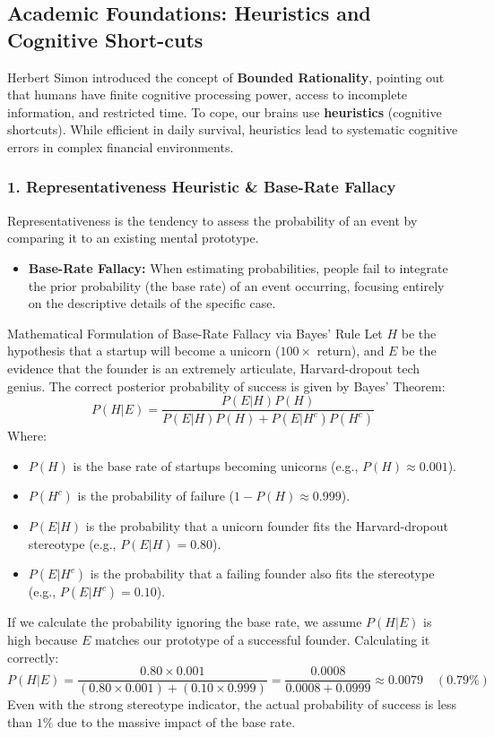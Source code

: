 \documentclass[11pt,a4paper]{article}
\begin{document}
\subsection{Academic Foundations: Heuristics and Cognitive Short-cuts}
Herbert Simon introduced the concept of \textbf{Bounded Rationality}, pointing out that humans have finite cognitive processing power, access to incomplete information, and restricted time. To cope, our brains use \textbf{heuristics} (cognitive shortcuts). While efficient in daily survival, heuristics lead to systematic cognitive errors in complex financial environments.

\subsubsection{1. Representativeness Heuristic \& Base-Rate Fallacy}
Representativeness is the tendency to assess the probability of an event by comparing it to an existing mental prototype.
\begin{itemize}
    \item \textbf{Base-Rate Fallacy:} When estimating probabilities, people fail to integrate the prior probability (the base rate) of an event occurring, focusing entirely on the descriptive details of the specific case.
\end{itemize}

\begin{academicbox}{Mathematical Formulation of Base-Rate Fallacy via Bayes' Rule}
Let $H$ be the hypothesis that a startup will become a unicorn ($100\times$ return), and $E$ be the evidence that the founder is an extremely articulate, Harvard-dropout tech genius.
The correct posterior probability of success is given by Bayes' Theorem:
\begin{equation}
    P(H|E) = \frac{P(E|H) P(H)}{P(E|H) P(H) + P(E|H^c) P(H^c)}
\end{equation}
Where:
\begin{itemize}
    \item $P(H)$ is the base rate of startups becoming unicorns (e.g., $P(H) \approx 0.001$).
    \item $P(H^c)$ is the probability of failure ($1 - P(H) \approx 0.999$).
    \item $P(E|H)$ is the probability that a unicorn founder fits the Harvard-dropout stereotype (e.g., $P(E|H) = 0.80$).
    \item $P(E|H^c)$ is the probability that a failing founder also fits the stereotype (e.g., $P(E|H^c) = 0.10$).
\end{itemize}
If we calculate the probability ignoring the base rate, we assume $P(H|E)$ is high because $E$ matches our prototype of a successful founder. Calculating it correctly:
\[ P(H|E) = \frac{0.80 \times 0.001}{(0.80 \times 0.001) + (0.10 \times 0.999)} = \frac{0.0008}{0.0008 + 0.0999} \approx 0.0079 \quad (0.79\%) \]
Even with the strong stereotype indicator, the actual probability of success is less than $1\%$ due to the massive impact of the base rate.
\end{academicbox}
\end{document}

